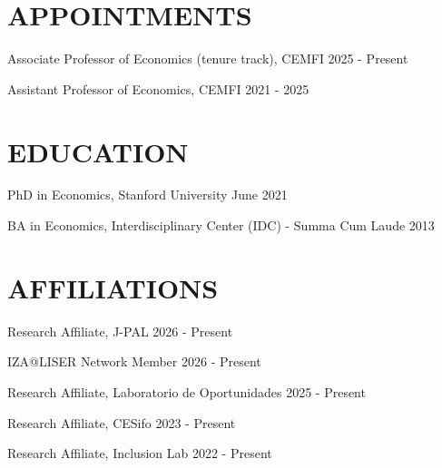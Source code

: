 \documentclass[margin]{res} %
\begin{document}
\begin{resume}


\section{APPOINTMENTS}

Associate Professor of Economics (tenure track), CEMFI \hfill 2025 - Present

Assistant Professor of Economics, CEMFI \hfill 2021 - 2025


\section{EDUCATION}

PhD in Economics, Stanford University \hfill June 2021

BA in Economics, Interdisciplinary Center (IDC) - Summa Cum Laude \hfill 2013

 

\section{AFFILIATIONS}

Research Affiliate, J-PAL \hfill 2026 - Present

IZA@LISER Network Member \hfill 2026 - Present

Research Affiliate, Laboratorio de Oportunidades \hfill 2025 - Present

Research Affiliate, CESifo \hfill 2023 - Present

Research Affiliate, Inclusion Lab \hfill 2022 - Present


\end{resume}
\end{document}
